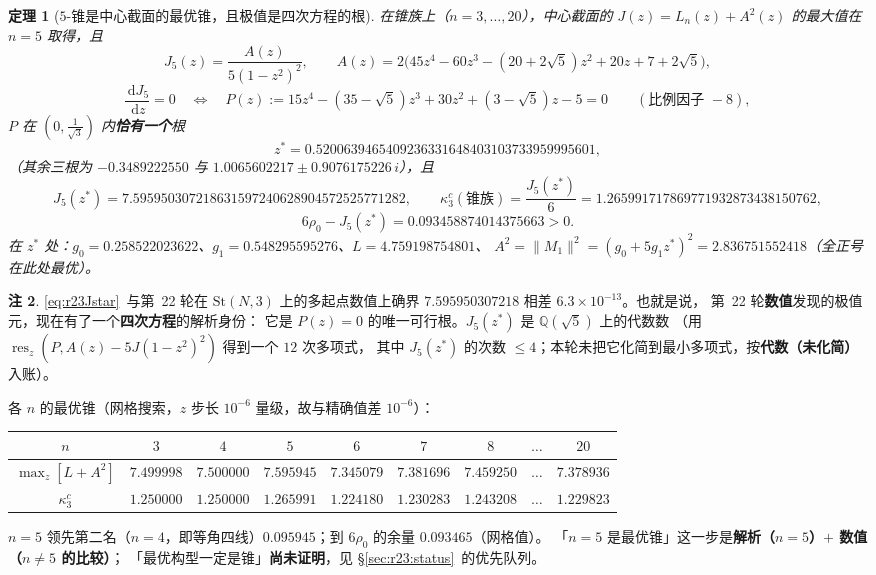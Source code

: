 \documentclass[UTF8,11pt]{ctexart}
\newtheorem{theorem}{定理}[section]
\theoremstyle{definition}
\newtheorem{remark}[theorem]{注}
\newcommand{\dd}{\,\mathrm{d}}
\newcommand{\Q}{\mathbb{Q}}
\begin{document}
\begin{theorem}[$5$-锥是中心截面的最优锥，且极值是四次方程的根]\label{thm:r23cone5}
在锥族上（$n=3,\dots,20$），中心截面的 $J(z)=L_n(z)+A^2(z)$ 的最大值在 $n=5$ 取得，且
\begin{equation}\label{eq:r23J5}
J_5(z)=\frac{A(z)}{5(1-z^2)^2},\qquad
A(z)=2\bigl(45z^4-60z^3-(20+2\sqrt5)z^2+20z+7+2\sqrt5\bigr),
\end{equation}
\begin{equation}\label{eq:r23P}
\frac{\dd J_5}{\dd z}=0\quad\Longleftrightarrow\quad
P(z):=15z^4-(35-\sqrt5)z^3+30z^2+(3-\sqrt5)z-5=0
\qquad(\text{比例因子 }-8),
\end{equation}
$P$ 在 $(0,\frac1{\sqrt3})$ 内\textbf{恰有一个}根
\begin{equation}\label{eq:r23zstar}
z^*=0.5200639465409236331648403103733959995601,
\end{equation}
（其余三根为 $-0.3489222550$ 与 $1.0065602217\pm0.9076175226\,i$），且
\begin{equation}\label{eq:r23Jstar}
J_5(z^*)=7.595950307218631597240628904572525771282,\qquad
\kappa_3^c(\text{锥族})=\frac{J_5(z^*)}6=1.265991717869771932873438150762,
\end{equation}
\[
6\rho_0-J_5(z^*)=0.093458874014375663>0 .
\]
在 $z^*$ 处：$g_0=0.258522023622$、$g_1=0.548295595276$、$L=4.759198754801$、
$A^2=\|M_1\|^2=(g_0+5g_1z^*)^2=2.836751552418$（全正号在此处最优）。
\end{theorem}

\begin{remark}
\eqref{eq:r23Jstar}~与第~22 轮在 $\mathrm{St}(N,3)$ 上的多起点数值上确界
$7.595950307218$ 相差 $6.3\times10^{-13}$。也就是说，
第~22 轮\textbf{数值}发现的极值元，现在有了一个\textbf{四次方程}的解析身份：
它是 $P(z)=0$ 的唯一可行根。$J_5(z^*)$ 是 $\Q(\sqrt5)$ 上的代数数
（用 $\operatorname{res}_z(P,A(z)-5J(1-z^2)^2)$ 得到一个 $12$ 次多项式，
其中 $J_5(z^*)$ 的次数 $\le4$；本轮未把它化简到最小多项式，按\textbf{代数（未化简）}入账）。
\end{remark}

各 $n$ 的最优锥（网格搜索，$z$ 步长 $10^{-6}$ 量级，故与精确值差 $10^{-6}$）：
\begin{center}\small
\begin{tabular}{c|cccccccc}
\toprule
$n$ & $3$ & $4$ & $5$ & $6$ & $7$ & $8$ & $\dots$ & $20$\\
\midrule
$\max_z[L+A^2]$ & $7.499998$ & $7.500000$ & $\mathbf{7.595945}$ & $7.345079$ & $7.381696$ & $7.459250$ & $\dots$ & $7.378936$\\
$\kappa_3^c$ & $1.250000$ & $1.250000$ & $\mathbf{1.265991}$ & $1.224180$ & $1.230283$ & $1.243208$ & $\dots$ & $1.229823$\\
\bottomrule
\end{tabular}
\end{center}
$n=5$ 领先第二名（$n=4$，即等角四线）$0.095945$；到 $6\rho_0$ 的余量 $0.093465$（网格值）。
「$n=5$ 是最优锥」这一步是\textbf{解析（$n=5$）$+$ 数值（$n\ne5$ 的比较）}；
「最优构型一定是锥」\textbf{尚未证明}，见 \S\ref{sec:r23:status}~的优先队列。
\end{document}
